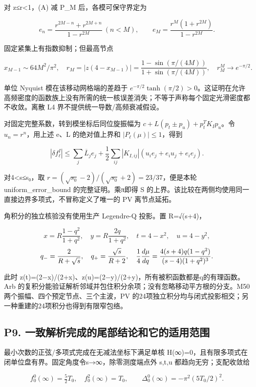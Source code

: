 \documentclass[
  11pt,
  a4paper,
]{article}
\begin{document}
对 \textbar z\textbar≤r\textless1，(A) 减 P\_M 后，各模可保守界定为

\[
e_n=\frac{r^{2M-n}+r^{2M+n}}{1-r^{2M}}\ (n<M),\qquad
e_M=\frac{r^M(1+r^{2M})}{1-r^{2M}}.
\]

固定紧集上有指数抑制；但最高节点

\[
x_{M-1}\sim64M^2/\pi^2,\quad
r_M=|z(4-x_{M-1})|=\frac{1-\sin(\pi/(4M))}{1+\sin(\pi/(4M))},
\quad r_M^M\to e^{-\pi/2}.
\]

单位 Nyquist 模在该移动网格端的差趋于
\(e^{-\pi/2}\tanh(\pi/2)>0\)。这证明在允许高频密度的函数族上没有所需的统一核误差消失；不等于声称每个固定光滑密度都不收敛。离散
L4 界不提供统一导数/高频衰减假设。

对固定完整系数，转到模坐标后同位旋振幅为
\(c+L(p_t\pm p_u)+p_t^T K_Ip_u\)。令 \(u_n=r^n\)，用上述 e、L
的绝对值上界和 \(|P_\ell(\mu)|\le1\)，得到

\[
|\delta f_\ell^I|\le\sum_j\overline L_j e_j+
\frac12\sum_{ij}|K_{I,ij}|(u_i e_j+e_i u_j+e_i e_j).
\tag{C}
\]

对4\textless s≤s₀，取
\(r=(\sqrt{s_0}-2)/(\sqrt{s_0}+2)=23/37\)，便是本轮
uniform\_error\_bound 的完整证明。乘π即得 S
的上界。该比较在两侧均使用同一直接边界多项式，不冒称定义了唯一的 PV
离节点延拓。

角积分的独立核验没有使用生产 Legendre-Q 投影。置 R=√(s+4)，

\[
x=R\frac{1-q^2}{1+q^2},\quad y=R\frac{2q}{1+q^2},\quad
t=4-x^2,\quad u=4-y^2,
\] \[
q_-={2\over R+\sqrt s},\quad q_+={\sqrt s\over R+2},\quad
{1\over4}{d\mu\over dq}={4(s+4)q(1-q^2)\over(s-4)(1+q^2)^3}.
\]

此时
z(t)=(2−x)/(2+x)、z(u)=(2−y)/(2+y)，所有被积函数都是q的有理函数。Arb
的复积分能验证解析邻域并包住积分余项；没有忽略移动平方根的分支。M50
两个振幅、四个预定节点、三个主波，PV
的24项独立积分均与闭式投影相交；另一种重建的24项积分也得到有限窄包络。

\subsection{P9.
一致解析完成的尾部结论和它的适用范围}\label{p9.-ux4e00ux81f4ux89e3ux6790ux5b8cux6210ux7684ux5c3eux90e8ux7ed3ux8bbaux548cux5b83ux7684ux9002ux7528ux8303ux56f4}

最小次数的正弦/多项式完成在无减法坐标下满足单核
H(∞)=0，且有限多项式在闭单位盘有界。固定角度令s→∞，除零测度端点外 s,t,u
都趋向无穷；支配收敛给

\[
f^0_0(\infty)=\tfrac52T_0,\quad f^2_0(\infty)=T_0,\qquad
\Delta^0_0(\infty)=-\pi^2(5T_0/2)^2.
\]
\end{document}
